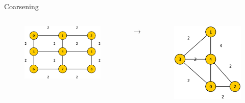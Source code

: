 \documentclass{beamer}
\begin{document}
\begin{frame}{Coarsening}

  \begin{columns}[c]
    \scriptsize
    \begin{center}
      \begin{figure}[htbp]
        \includegraphics[scale=.15]{img/coarsening.eps}
      \end{figure}
    \end{center}

    \begin{center}
      $\longrightarrow$  
    \end{center}    
    
    \begin{center}
      \begin{figure}[htbp]
        \includegraphics[scale=.15]{img/coarsening2.eps}
      \end{figure}
    \end{center}


\end{columns}
\end{frame}
\end{document}
